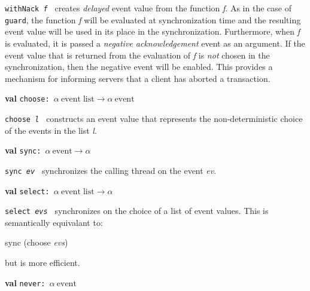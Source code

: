 \begin{descr}
\begin{speccomment}
\item {\tt with\-Nack \textit{f}           } 
creates \textit{delayed} event value from the function \textit{f}.\- 	  As in the case of \texttt{guard}, the function \textit{f} will be evaluated 	  at synchronization time and the resulting event value will be 	  used in its place in the synchronization.\- 	  Furthermore, when \textit{f} is evaluated, it is passed a \textit{negative 	  acknowledgement} event as an argument.\- 	  If the event value that is returned from the evaluation of \textit{f} 	  is \emph{not} chosen in the synchronization, then the negative 	  event will be enabled.\- 	  This provides a mechanism for informing servers that a client has 	  aborted a transaction.\-     \end{speccomment}
\item {}{\textbf{val}} {\tt choose: \(\alpha\:\mathrm{event}\;\mathrm{list}\rightarrow \alpha\:\mathrm{event}\)}\label{val-CML.choose}


\begin{speccomment}
\item {\tt choose \textit{l}           } 
constructs an event value that represents the non-deterministic 	  choice of the events in the list \textit{l}.\-     \end{speccomment}
\item {}{\textbf{val}} {\tt sync: \(\alpha\:\mathrm{event}\rightarrow \alpha\)}\label{val-CML.sync}


\begin{speccomment}
\item {\tt sync \textit{ev}           } 
synchronizes the calling thread on the event \textit{ev}.\-     \end{speccomment}
\item {}{\textbf{val}} {\tt select: \(\alpha\:\mathrm{event}\;\mathrm{list}\rightarrow \alpha\)}\label{val-CML.select}


\begin{speccomment}
\item {\tt select \textit{evs}           } 
synchronizes on the choice of a list of event values.\- 	  This is semantically equivalant to: 	  
\begin{code}
	    sync (choose \textit{evs})
	  
\end{code}
 	  but is more efficient.\-     \end{speccomment}
\item {}{\textbf{val}} {\tt never: \(\alpha\:\mathrm{event}\)}\label{val-CML.never}



\end{descr}
